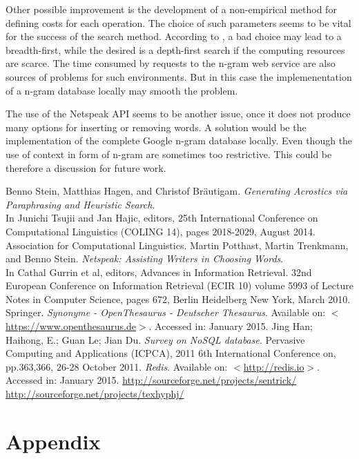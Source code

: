 \documentclass{reportAlternative}
\begin{document}
Other possible improvement is the development of a non-empirical method for defining costs for each operation. The choice of such parameters seems to be vital for the success of the search method. According to \cite[p.~2023]{Stein}, a bad choice may lead to a breadth-first, while the desired is a depth-first search if the computing resources are scarce. The time consumed by requests to the n-gram web service are also sources of problems for such environments. But in this case the implemenentation of a n-gram database locally may smooth the problem. \par

The use of the Netspeak API seems to be another issue, once it does not produce many options for inserting or removing words. A solution would be the implementation of the complete Google n-gram database locally. Even though the use of context in form of n-gram are sometimes too restrictive. This could be therefore a discussion for future work.


\begin{thebibliography}{1}
	Benno Stein, Matthias Hagen, and Christof Bräutigam. \emph{Generating Acrostics via Paraphrasing and Heuristic Search}. \\
	In Junichi Tsujii and Jan Hajic, editors, 25th International Conference on Computational Linguistics (COLING 14), pages 2018-2029, August 2014. Association for Computational Linguistics. 
	Martin Potthast, Martin Trenkmann, and Benno Stein.
	\emph{Netspeak: Assisting Writers in Choosing Words}. \\
	In Cathal Gurrin et al, editors, Advances in Information Retrieval. 32nd European Conference on Information Retrieval (ECIR 10) volume 5993 of Lecture Notes in Computer Science, pages 672, Berlin Heidelberg New York, March 2010. Springer.
	\emph{Synonyme - OpenThesaurus - Deutscher Thesaurus}.
	Available on: $<$\url{https://www.openthesaurus.de}$>$.
	Accessed in: January 2015.
	Jing Han; Haihong, E.; Guan Le; Jian Du. \emph{Survey on NoSQL database}. Pervasive Computing and Applications (ICPCA), 2011 6th International Conference on, pp.363,366, 26-28 October 2011.
	\emph{Redis}.
	Available on: $<$\url{http://redis.io}$>$.
	Accessed in: January 2015.
\url{http://sourceforge.net/projects/sentrick/}
\url{http://sourceforge.net/projects/texhyphj/}
\end{thebibliography}

\appendix
\chapter{Appendix}
\end{document}
